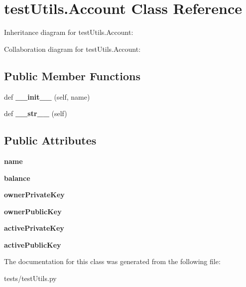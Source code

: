 \hypertarget{classtest_utils_1_1_account}{}\section{test\+Utils.\+Account Class Reference}
\label{classtest_utils_1_1_account}


Inheritance diagram for test\+Utils.\+Account\+:


Collaboration diagram for test\+Utils.\+Account\+:
\subsection*{Public Member Functions}
\begin{DoxyCompactItemize}
\item 
\mbox{\label{classtest_utils_1_1_account_aa44177ff442ca4776fe6a6c10e3fcd0d}} 
def {\bfseries \+\_\+\+\_\+init\+\_\+\+\_\+} (self, name)
\item 
\mbox{\label{classtest_utils_1_1_account_a33de09117a744dd3e5e80f07751453c0}} 
def {\bfseries \+\_\+\+\_\+str\+\_\+\+\_\+} (self)
\end{DoxyCompactItemize}
\subsection*{Public Attributes}
\begin{DoxyCompactItemize}
\item 
\mbox{\label{classtest_utils_1_1_account_a414f8ff00ed19fdddd326861635da43f}} 
{\bfseries name}
\item 
\mbox{\label{classtest_utils_1_1_account_a848ec56bcce5f53233989ccac4176837}} 
{\bfseries balance}
\item 
\mbox{\label{classtest_utils_1_1_account_a7d0fe8476276549cdb84f42d14eddd16}} 
{\bfseries owner\+Private\+Key}
\item 
\mbox{\label{classtest_utils_1_1_account_ab742c63da4c226bbe4a6ab8b9752bcba}} 
{\bfseries owner\+Public\+Key}
\item 
\mbox{\label{classtest_utils_1_1_account_a81ed28aad975478273b36e14cb357782}} 
{\bfseries active\+Private\+Key}
\item 
\mbox{\label{classtest_utils_1_1_account_a4ac65ca193a946e5c3abce28749a13cf}} 
{\bfseries active\+Public\+Key}
\end{DoxyCompactItemize}


The documentation for this class was generated from the following file\+:\begin{DoxyCompactItemize}
\item 
tests/test\+Utils.\+py\end{DoxyCompactItemize}
